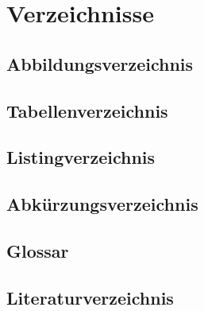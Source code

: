 
\chapter{Verzeichnisse}

\section{Abbildungsverzeichnis}
\listoffigures
\newpage

\section{Tabellenverzeichnis}
\listoftables
\newpage

\section{Listingverzeichnis}
\lstlistoflistings
\newpage

\section{Abkürzungsverzeichnis}
\printacronyms
\newpage

\section{Glossar}
\printglossary
\newpage

\section{Literaturverzeichnis}
\printbibliography[heading=none]

